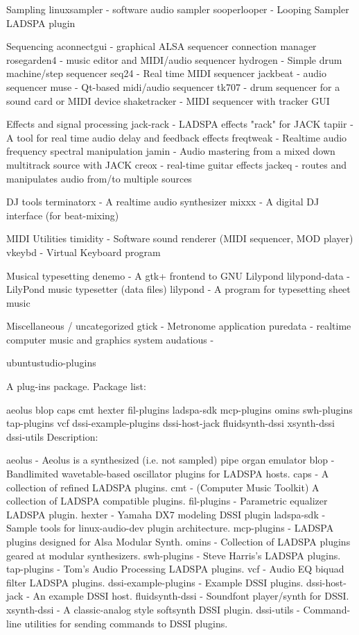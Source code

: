 \documentclass[12pt,brazil]{book}
\begin{document}
Sampling
      linuxsampler - software audio sampler
      sooperlooper - Looping Sampler LADSPA plugin

Sequencing
      aconnectgui - graphical ALSA sequencer connection manager
      rosegarden4 - music editor and MIDI/audio sequencer
      hydrogen - Simple drum machine/step sequencer
      seq24 - Real time MIDI sequencer
      jackbeat - audio sequencer
      muse - Qt-based midi/audio sequencer
      tk707 - drum sequencer for a sound card or MIDI device
      shaketracker - MIDI sequencer with tracker GUI

Effects and signal processing
      jack-rack - LADSPA effects "rack" for JACK
      tapiir - A tool for real time audio delay and feedback effects
      freqtweak - Realtime audio frequency spectral manipulation
      jamin - Audio mastering from a mixed down multitrack source with JACK
      creox - real-time guitar effects
      jackeq - routes and manipulates audio from/to multiple sources

DJ tools
      terminatorx - A realtime audio synthesizer
      mixxx - A digital DJ interface (for beat-mixing)

MIDI Utilities
      timidity - Software sound renderer (MIDI sequencer, MOD player)
      vkeybd - Virtual Keyboard program

Musical typesetting
      denemo - A gtk+ frontend to GNU Lilypond
      lilypond-data - LilyPond music typesetter (data files)
      lilypond - A program for typesetting sheet music

Miscellaneous / uncategorized
      gtick - Metronome application
      puredata - realtime computer music and graphics system
      audatious -

ubuntustudio-plugins

A plug-ins package.
Package list:

aeolus blop caps cmt hexter fil-plugins ladspa-sdk mcp-plugins omins swh-plugins tap-plugins vcf dssi-example-plugins dssi-host-jack fluidsynth-dssi xsynth-dssi dssi-utils
Description:

      aeolus - Aeolus is a synthesized (i.e. not sampled) pipe organ emulator
      blop - Bandlimited wavetable-based oscillator plugins for LADSPA hosts.
      caps - A collection of refined LADSPA plugins.
      cmt - (Computer Music Toolkit) A collection of LADSPA compatible plugins.
      fil-plugins - Parametric equalizer LADSPA plugin.
      hexter - Yamaha DX7 modeling DSSI plugin
      ladspa-sdk - Sample tools for linux-audio-dev plugin architecture.
      mcp-plugins - LADSPA plugins designed for Alsa Modular Synth.
      omins - Collection of LADSPA plugins geared at modular synthesizers.
      swh-plugins - Steve Harris's LADSPA plugins.
      tap-plugins - Tom's Audio Processing LADSPA plugins.
      vcf - Audio EQ biquad filter LADSPA plugins.
      dssi-example-plugins - Example DSSI plugins.
      dssi-host-jack - An example DSSI host.
      fluidsynth-dssi - Soundfont player/synth for DSSI.
      xsynth-dssi - A classic-analog style softsynth DSSI plugin.
      dssi-utils - Command-line utilities for sending commands to DSSI plugins.
\end{document}

